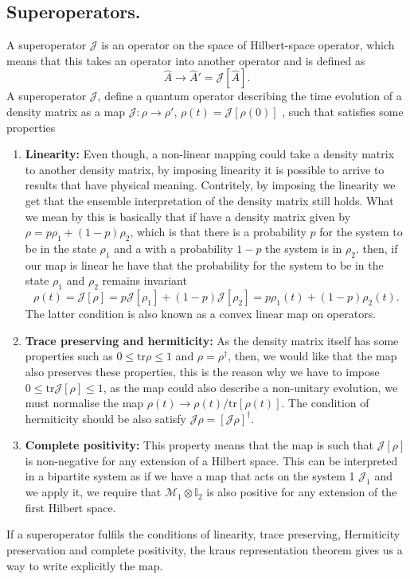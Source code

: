 \begin{appendix}
\chapter{Superoperators.}\label{superoperators}
A superoperator $\mathcal{J}$ is an operator on the space of Hilbert-space operator, which means that this takes an operator into another operator and is defined as
\begin{equation}
\hat{A}\rightarrow\hat{A}'=\mathcal{J}[\hat{A}].
\label{superoperatoreq1}
\end{equation}
A superoperator $\mathcal{J}$, define a quantum operator describing the time evolution of a density matrix as a map $\mathcal{J}:\rho\rightarrow\rho'$, $\rho(t)=\mathcal{J}[\rho(0)]$ , such that satisfies some properties
\begin{enumerate}
\item \textbf{Linearity:} Even though, a non-linear mapping could take a density matrix to another density matrix, by imposing linearity it is possible to arrive to results that have physical meaning. Contritely, by imposing the linearity we get that the ensemble interpretation of the density matrix  still holds. What we mean by this is basically that if have a density matrix given by $\rho=p\rho_{1}+(1-p)\rho_{2}$, which is that there is a probability $p$ for the system to be in the state $\rho_{1}$ and a with a probability $1-p$ the system is in $\rho_{2}$. then, if our map is linear he have that the probability for the system to be in the state $\rho_{1}$ and $\rho_{2}$ remains invariant 
\[\rho(t)=\mathcal{J}[\rho]=p\mathcal{J}[\rho_{1}]+(1-p)\mathcal{J}[\rho_2]=p\rho_1(t)+(1-p)\rho_2(t).\]
The latter condition is also known as a convex linear map on operators.
\item \textbf{Trace preserving and hermiticity:}  As the density matrix itself has some properties such as $0\leq\text{tr}\rho\leq 1$ and $\rho=\rho^{\dagger}$, then, we would like that the map also preserves these properties, this is the reason why we have to impose $0\leq \text{tr} \mathcal{J}[\rho]\leq 1$, as the map could also describe a non-unitary evolution, we must normalise the map $\rho(t)\rightarrow\rho(t)/\text{tr}[\rho(t)]$. The condition of hermiticity should be also satisfy $\mathcal{J}\rho=\left[\mathcal{J}\rho\right]^{\dagger}$.
\item \textbf{Complete positivity:} This property means that the map is such that $\mathcal{J}[\rho]$ is non-negative for any extension of a Hilbert space. This can be interpreted  in a bipartite system as if we have a map that acts on the system 1 $\mathcal{J}_{1}$ and we apply it, we require that $\mathcal{M}_{1}\otimes\mathbb{I}_{2}$ is also positive for any extension of the first Hilbert space.
\end{enumerate}
If a superoperator fulfils the conditions of linearity, trace preserving, Hermiticity preservation and complete positivity, the kraus representation theorem gives us a way to write explicitly the map.

\end{appendix}
